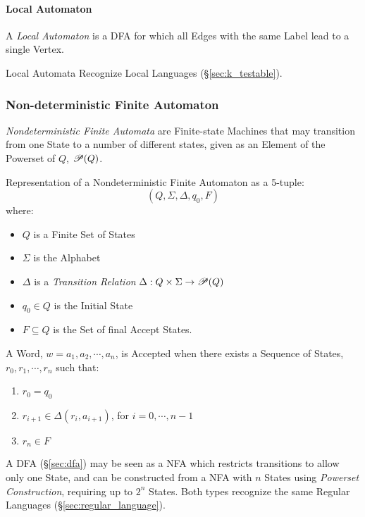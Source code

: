 \paragraph{Local Automaton}\label{sec:local_automaton}\hfill

A \emph{Local Automaton} is a DFA for which all Edges with the same
Label lead to a single Vertex.

Local Automata Recognize Local Languages (\S\ref{sec:k_testable}).



\subsubsection{Non-deterministic Finite Automaton}\label{sec:ndfa}

\emph{Nondeterministic Finite Automata} are Finite-state Machines that
may transition from one State to a number of different states, given
as an Element of the Powerset of $Q$, $\mathscr{P}(Q)$.

Representation of a Nondeterministic Finite Automaton as a
5-tuple:
\[
  (Q,\Sigma,\Delta,q_0,F)
\]
where:
\begin{itemize}
  \item $Q$ is a Finite Set of States
  \item $\Sigma$ is the Alphabet
  \item $\Delta$ is a \emph{Transition Relation} $\Delta: Q \times
    \Sigma \rightarrow \mathscr{P}(Q)$
  \item $q_0 \in Q$ is the Initial State
  \item $F \subseteq Q$ is the Set of final Accept States.
\end{itemize}

A Word, $w=a_1,a_2,\cdots,a_n$, is Accepted when there exists a
Sequence of States, $r_0,r_1,\cdots,r_n$ such that:
\begin{enumerate}
  \item $r_0 = q_0$
  \item $r_{i+1} \in \Delta(r_i, a_{i+1})$, for $i = 0, \cdots, n-1$
  \item $r_n \in F$
\end{enumerate}

A DFA (\S\ref{sec:dfa}) may be seen as a NFA which restricts
transitions to allow only one State, and can be constructed from a NFA
with $n$ States using \emph{Powerset Construction}, requiring up to
$2^n$ States. Both types recognize the same Regular Languages
(\S\ref{sec:regular_language}).



